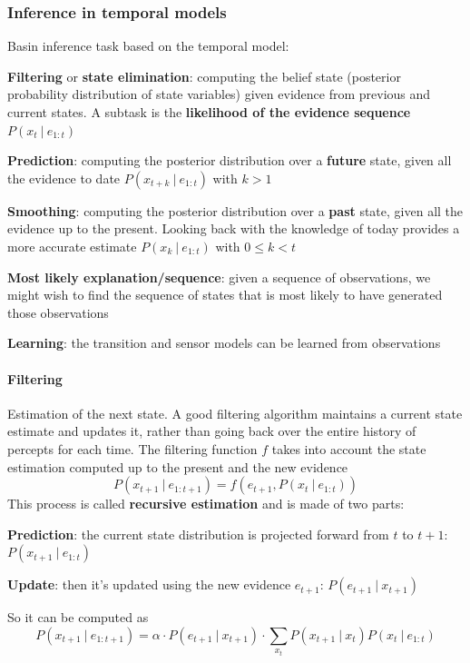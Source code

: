 \documentclass[10pt]{report}
\begin{document}
\subsubsection{Inference in temporal models}
Basin inference task based on the temporal model:
\begin{list}{}{}
	\item \textbf{Filtering} or \textbf{state elimination}: computing the belief state (posterior probability distribution of state variables) given evidence from previous and current states. A subtask is the \textbf{likelihood of the evidence sequence $P(x_t\:|\:e_{1:t})$}
	\item \textbf{Prediction}: computing the posterior distribution over a \textbf{future} state, given all the evidence to date $P(x_{t+k}\:|\:e_{1:t})$ with $k>1$
	\item \textbf{Smoothing}: computing the posterior distribution over a \textbf{past} state, given all the evidence up to the present. Looking back with the knowledge of today provides a more accurate estimate $P(x_k\:|\:e_{1:t})$ with $0\leq k < t$
	\item \textbf{Most likely explanation/sequence}: given a sequence of observations, we might wish to find the sequence of states that is most likely to have generated those observations
	\item \textbf{Learning}: the transition and sensor models can be learned from observations
\end{list}
\paragraph{Filtering} Estimation of the next state. A good filtering algorithm maintains a current state estimate and updates it, rather than going back over the entire history of percepts for each time. The filtering function $f$ takes into account the state estimation computed up to the present and the new evidence $$P(x_{t+1}\:|\:e_{1:t+1}) = f(e_{t+1},P(x_t\:|\:e_{1:t}))$$
This process is called \textbf{recursive estimation} and is made of two parts:
\begin{list}{}{}
	\item \textbf{Prediction}: the current state distribution is projected forward from $t$ to $t+1$: $P(x_{t+1}\:|\:e_{1:t})$
	\item \textbf{Update}: then it's updated using the new evidence $e_{t+1}$: $P(e_{t+1}\:|\:x_{t+1})$
\end{list}
So it can be computed as $$P(x_{t+1}\:|\:e_{1:t+1}) = \alpha\cdot P(e_{t+1}\:|\:x_{t+1})\cdot\sum_{x_t} P(x_{t+1}\:|\:x_t)P(x_t\:|\:e_{1:t})$$
\end{document}
